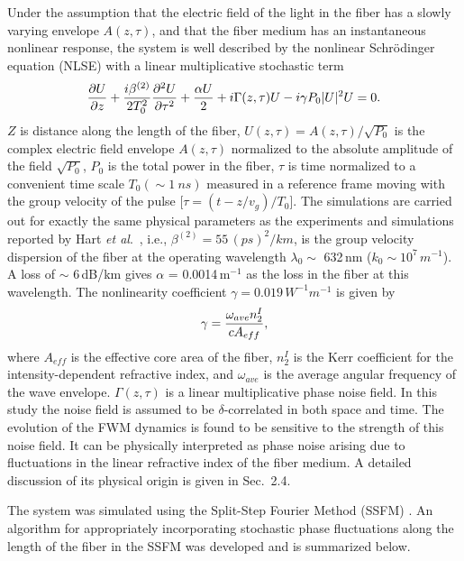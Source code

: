 Under the assumption that the electric field of the light in the fiber has a
slowly varying envelope $A(z,\tau)$, and that the fiber medium has an
instantaneous nonlinear response, the system is well described by the
nonlinear Schr\"{o}dinger equation (NLSE) with a linear multiplicative
stochastic term
\begin{equation}
{\partial U \over \partial z} + {i\beta^{(2)} \over 2T_0^2}
{\partial^2 U \over \partial\tau^2} + {\alpha U \over 2}
 + i\Gamma(z,\tau)U-i\gamma P_0 |U|^2 U = 0.
\end{equation}
$Z$ is distance along the length of the fiber,
$U(z,\tau)=A(z,\tau)/\sqrt{P_0}$ is the complex electric field envelope
$A(z,\tau)$ normalized to the absolute amplitude of the field $\sqrt{P_0}$,
$P_0$ is the total power in the fiber, $\tau$ is time normalized to a
convenient time scale $T_0(\sim 1\ ns)$ measured in a reference frame
moving with the group velocity of the pulse [$\tau=(t-z/v_g)/T_0$]. The
simulations are carried out for exactly the same physical parameters as the
experiments and simulations reported by Hart {\it et al}.\ \cite{hart1}, i.e.,
$\beta^{(2)}=55\,(ps)^2/km$, is the group velocity dispersion of the fiber at
the operating wavelength $\lambda_{0}\sim$ 632\,nm
($k_0\sim 10^7\,m^{-1}$). A loss of $\sim$ 6\,dB/km gives $\alpha$ = 0.0014\,m$^{-1}$ as the
loss in the fiber at this wavelength. The nonlinearity coefficient
$\gamma=0.019\,W^{-1}m^{-1}$ is given by
\begin{equation}
\gamma = {\omega_{ave}n_2^I \over cA_{eff}},
\end{equation}
where $A_{eff}$ is the effective core area of the fiber,
$n_2^I$ is the Kerr coefficient for the intensity-dependent refractive index, and
$\omega_{ave}$ is the average angular frequency of the wave envelope.
$\Gamma(z,\tau)$ is a linear multiplicative phase noise field. In this study
the noise field is assumed to be $\delta$-correlated in both space and time.
The evolution of the FWM dynamics is found to be sensitive to the strength of
this noise field. It can be physically interpreted as phase noise arising due
to fluctuations in the linear refractive index of the fiber medium. A detailed
discussion of its physical origin is given in Sec.\ 2.4.

The system was simulated using the Split-Step Fourier Method (SSFM)
\cite{Agrawal2}. An algorithm for appropriately incorporating stochastic
phase fluctuations along the length of the fiber in the SSFM was developed
and is summarized below.

